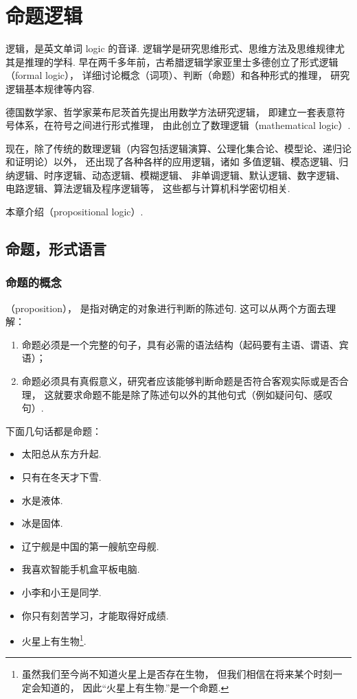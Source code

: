 \chapter{命题逻辑}
逻辑，是英文单词 logic 的音译.
逻辑学是研究思维形式、思维方法及思维规律尤其是推理的学科.
早在两千多年前，古希腊逻辑学家亚里士多德创立了形式逻辑（formal logic），
详细讨论概念（词项）、判断（命题）和各种形式的推理，
研究逻辑基本规律等内容.

德国数学家、哲学家莱布尼茨首先提出用数学方法研究逻辑，
即建立一套表意符号体系，在符号之间进行形式推理，
由此创立了数理逻辑（mathematical logic）.

现在，除了传统的数理逻辑（内容包括逻辑演算、公理化集合论、模型论、递归论和证明论）以外，
还出现了各种各样的应用逻辑，诸如
多值逻辑、模态逻辑、归纳逻辑、时序逻辑、动态逻辑、模糊逻辑、
非单调逻辑、默认逻辑、数字逻辑、电路逻辑、算法逻辑及程序逻辑等，
这些都与计算机科学密切相关.

本章介绍（propositional logic）.

\section{命题，形式语言}
\subsection{命题的概念}
（proposition），
是指对确定的对象进行判断的陈述句.
这可以从两个方面去理解：\begin{enumerate}
	\item 命题必须是一个完整的句子，具有必需的语法结构（起码要有主语、谓语、宾语）；
	\item 命题必须具有真假意义，研究者应该能够判断命题是否符合客观实际或是否合理，
	这就要求命题不能是除了陈述句以外的其他句式（例如疑问句、感叹句）.
\end{enumerate}

下面几句话都是命题：\begin{itemize}
	\item 太阳总从东方升起.
	\item 只有在冬天才下雪.
	\item 水是液体.
	\item 冰是固体.
	\item 辽宁舰是中国的第一艘航空母舰.
	\item 我喜欢智能手机盒平板电脑.
	\item 小李和小王是同学.
	\item 你只有刻苦学习，才能取得好成绩.
	\item 火星上有生物\footnote{
		虽然我们至今尚不知道火星上是否存在生物，
		但我们相信在将来某个时刻一定会知道的，
		因此“火星上有生物.”是一个命题.
	}.
\end{itemize}

